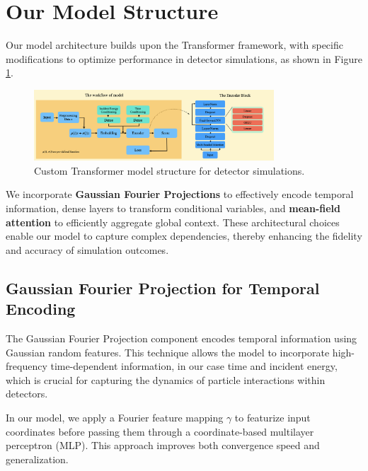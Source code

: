 
\section{Our Model Structure}
Our model architecture builds upon the Transformer framework, with specific modifications to optimize performance in detector simulations, as shown in Figure \ref{fig:model_structure}.

\begin{figure}[ht]
    \centering
    \includegraphics[width=0.8\textwidth]{Figures/model_structure1.png}
    \caption{Custom Transformer model structure for detector simulations.}
    \label{fig:model_structure}

\end{figure}
We incorporate \textbf{Gaussian Fourier Projections} \cite{tancik_fourier_2020} to effectively encode temporal information, dense layers to transform conditional variables, and \textbf{mean-field attention} \cite{kach_pay_2024} to efficiently aggregate global context. These architectural choices enable our model to capture complex dependencies, thereby enhancing the fidelity and accuracy of simulation outcomes.

\subsection{Gaussian Fourier Projection for Temporal Encoding}
The Gaussian Fourier Projection component encodes temporal information using Gaussian random features. This technique allows the model to incorporate high-frequency time-dependent information, in our case time and incident energy, which is crucial for capturing the dynamics of particle interactions within detectors.

In our model, we apply a Fourier feature mapping \( \gamma \) to featurize input coordinates before passing them through a coordinate-based multilayer perceptron (MLP). This approach improves both convergence speed and generalization.

